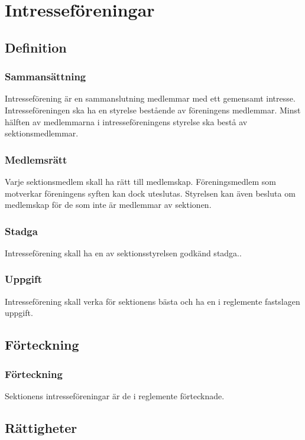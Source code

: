 \section{Intresseföreningar}

\subsection{Definition}

\subsubsection{Sammansättning}
Intresseförening är en sammanslutning medlemmar med ett gemensamt intresse. Intresseföreningen ska ha en styrelse bestående av föreningens medlemmar. Minst hälften av medlemmarna i intresseföreningens styrelse ska bestå av sektionsmedlemmar.

\subsubsection{Medlemsrätt}
Varje sektionsmedlem skall ha rätt till medlemskap. Föreningsmedlem som motverkar föreningens syften kan dock uteslutas. Styrelsen kan även besluta om medlemskap för de som inte är medlemmar av sektionen.

\subsubsection{Stadga}
Intresseförening skall ha en av sektionsstyrelsen godkänd stadga..

\subsubsection{Uppgift}
Intresseförening skall verka för sektionens bästa och ha en i reglemente fastslagen uppgift.

\subsection{Förteckning}

\subsubsection{Förteckning}
Sektionens intresseföreningar är de i reglemente förtecknade.

\subsection{Rättigheter}

